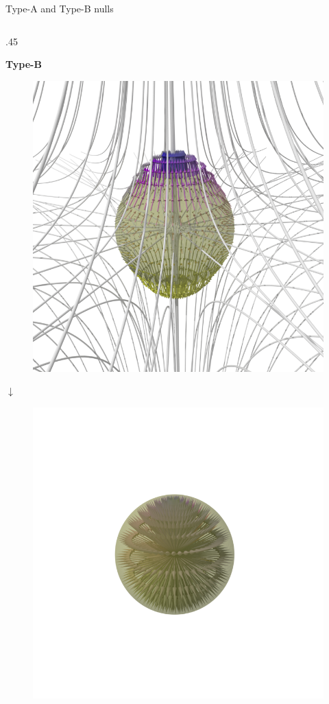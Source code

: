 \documentclass[final]{beamer}
\newlength{\onecolwid}
\newlength{\twocolwid}
\begin{document}
\begin{frame}[t]
\begin{columns}[t]
\begin{column}{\twocolwid}
\begin{columns}[t,totalwidth=\twocolwid]
\begin{column}{\onecolwid}
\begin{block}{Type-A and Type-B nulls}
\begin{columns}[t,totalwidth=\onecolwid]
    \begin{column}{.45\onecolwid}
        \begin{centering}
        \textbf{Type-B}
        \begin{figure}
        \includegraphics[width=.45\onecolwid]{fig/posindex_start.png}
        \end{figure}
        $\downarrow$
        \begin{figure}
        \includegraphics[width=.45\onecolwid]{fig/posindex_end.png}

\end{figure}
\end{centering}
\end{column}
\end{columns}
\end{block}
\end{column}
\end{columns}
\end{column}
\end{columns}
\end{frame}
\end{document}
